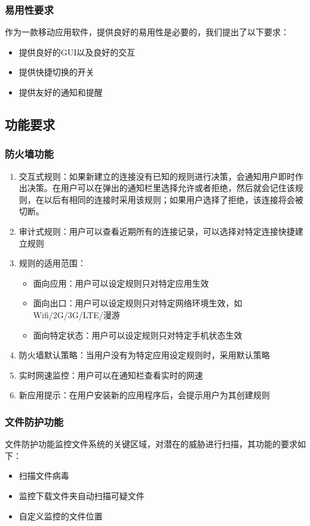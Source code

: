 \documentclass[format=final, language=chinese, degree=fyp]{hustthesis}
\begin{document}
\subsubsection{易用性要求}
	作为一款移动应用软件，提供良好的易用性是必要的，我们提出了以下要求：
	\begin{itemize}
		\item 提供良好的GUI以及良好的交互
		\item 提供快捷切换的开关
		\item 提供友好的通知和提醒
	\end{itemize}

\subsection{功能要求}

\subsubsection{防火墙功能}
\begin{enumerate}
	\item 交互式规则：如果新建立的连接没有已知的规则进行决策，会通知用户即时作出决策。在用户可以在弹出的通知栏里选择允许或者拒绝，然后就会记住该规则，在以后有相同的连接时采用该规则；如果用户选择了拒绝，该连接将会被切断。
	\item 审计式规则：用户可以查看近期所有的连接记录，可以选择对特定连接快捷建立规则
	\item 规则的适用范围：
		\begin{itemize}
			\item 面向应用：用户可以设定规则只对特定应用生效
			\item 面向出口：用户可以设定规则只对特定网络环境生效，如Wifi/2G/3G/LTE/漫游
			\item 面向特定状态：用户可以设定规则只对特定手机状态生效
		\end{itemize}
	\item 防火墙默认策略：当用户没有为特定应用设定规则时，采用默认策略
	\item 实时网速监控：用户可以在通知栏查看实时的网速
	\item 新应用提示：在用户安装新的应用程序后，会提示用户为其创建规则
\end{enumerate}

\subsubsection{文件防护功能}

文件防护功能监控文件系统的关键区域，对潜在的威胁进行扫描，其功能的要求如下：
\begin{itemize}
	\item 扫描文件病毒
	\item 监控下载文件夹自动扫描可疑文件
	\item 自定义监控的文件位置
\end{itemize}
\end{document}
